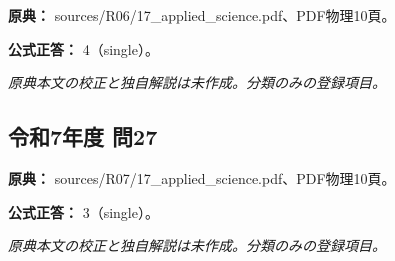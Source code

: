 \noindent\textbf{原典：} sources/R06/17\_applied\_science.pdf、PDF物理10頁。

\textbf{公式正答：} 4（single）。

\par\textit{原典本文の校正と独自解説は未作成。分類のみの登録項目。}

\subsection{令和7年度 問27}
\label{q:r07-reg-applied-27}

\noindent\textbf{原典：} sources/R07/17\_applied\_science.pdf、PDF物理10頁。

\textbf{公式正答：} 3（single）。

\par\textit{原典本文の校正と独自解説は未作成。分類のみの登録項目。}
